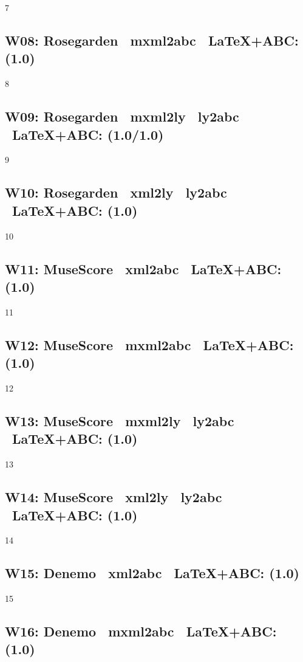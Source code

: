 7

\subsection{W08: Rose\-garden \ra\ mxml2abc \ra\ \LaTeX+ABC: (1.0)} 

8

\subsection{W09: Rose\-garden \ra\ mxml2ly \ra\ ly2abc \ra\ \LaTeX+ABC: (1.0/1.0)} 

9

\subsection{W10: Rose\-garden \ra\ xml2ly \ra\ ly2abc \ra\ \LaTeX+ABC: (1.0)} 

10

\subsection{W11: Muse\-Score \ra\ xml2abc \ra\ \LaTeX+ABC: (1.0)} 

11

\subsection{W12: Muse\-Score \ra\ mxml2abc \ra\ \LaTeX+ABC: (1.0)}

12

\subsection{W13: Muse\-Score \ra\ mxml2ly \ra\ ly2abc \ra\ \LaTeX+ABC: (1.0)} 

13

\subsection{W14: Muse\-Score \ra\ xml2ly \ra\ ly2abc \ra\ \LaTeX+ABC: (1.0)}

14

\subsection{W15: Denemo \ra\ xml2abc \ra\ \LaTeX+ABC: (1.0)}

15

\subsection{W16: Denemo \ra\ mxml2abc \ra\ \LaTeX+ABC: (1.0)} 

